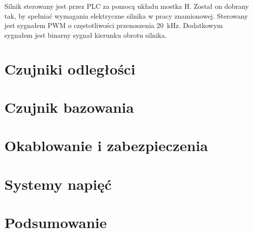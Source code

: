 Silnik sterowany jest przez PLC za pomocą układu mostka H. Został on dobrany tak, by spełniać wymagania elektryczne silnika w pracy znamionowej. Sterowany jest sygnałem PWM o częstotliwości przenoszenia \SI{20}{\kilo\hertz}. Dodatkowym sygnałem jest binarny sygnał kierunku obrotu silnika.


\section{Czujniki odległości}
\label{sec:ch3_czujniki_odleglosci}


\section{Czujnik bazowania}
\label{sec:ch3_czujnik_bazowania}


\section{Okablowanie i zabezpieczenia}
\label{sec:ch3_okablowanie_zabezpieczenia}


\section{Systemy napięć}
\label{sec:ch3_systemy_napiec}


\section{Podsumowanie}


